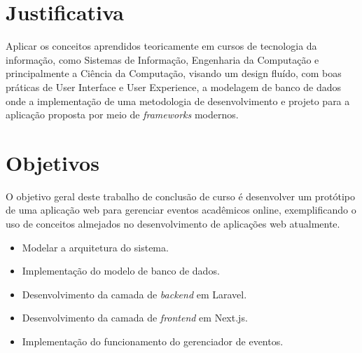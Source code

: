 

\section{Justificativa}

Aplicar os conceitos aprendidos teoricamente em cursos de tecnologia da informação, como Sistemas de Informação, Engenharia da Computação e principalmente a Ciência da Computação, visando um design fluído, com boas práticas de User Interface e User Experience, a modelagem de banco de dados onde a implementação de uma metodologia de desenvolvimento e projeto para a aplicação proposta por meio de \textit{frameworks} modernos.


\section{Objetivos}
O objetivo geral deste trabalho de conclusão de curso é desenvolver um protótipo de uma aplicação web para gerenciar eventos acadêmicos online, exemplificando o uso de conceitos almejados no desenvolvimento de aplicações web atualmente. 


\begin{itemize}
    \item Modelar a arquitetura do sistema.
    \item Implementação do modelo de banco de dados.
    \item Desenvolvimento da camada de \textit{backend} em Laravel.
    \item Desenvolvimento da camada de \textit{frontend} em Next.js.
    \item Implementação do funcionamento do gerenciador de eventos.
\end{itemize}

